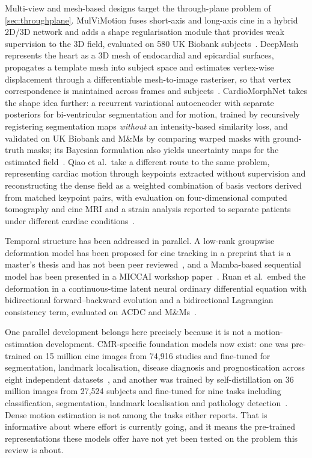 Multi-view and mesh-based designs target the through-plane problem of \cref{sec:throughplane}.
MulViMotion fuses short-axis and long-axis cine in a hybrid 2D/3D network and adds a shape
regularisation module that provides weak supervision to the 3D field, evaluated on 580 UK Biobank
subjects~\citep{meng2022mulvimotion}. DeepMesh represents the heart as a 3D mesh of endocardial and
epicardial surfaces, propagates a template mesh into subject space and estimates vertex-wise
displacement through a differentiable mesh-to-image rasteriser, so that vertex correspondence is
maintained across frames and subjects~\citep{meng2024deepmesh}. CardioMorphNet takes the shape idea
further: a recurrent variational autoencoder with separate posteriors for bi-ventricular
segmentation and for motion, trained by recursively registering segmentation maps \emph{without} an
intensity-based similarity loss, and validated on UK Biobank and M\&Ms by comparing warped masks
with ground-truth masks; its Bayesian formulation also yields uncertainty maps for the estimated
field~\citep{movahed2026cardiomorphnet}. Qiao et al.\ take a different route to the same problem,
representing cardiac motion through keypoints extracted without supervision and reconstructing the
dense field as a weighted combination of basis vectors derived from matched keypoint pairs, with
evaluation on four-dimensional computed tomography and cine MRI and a strain analysis reported to
separate patients under different cardiac conditions~\citep{qiao2026stcmt}.

Temporal structure has been addressed in parallel. A
low-rank groupwise deformation model has been proposed for cine tracking in a preprint that is a
master's thesis and has not been peer reviewed~\citep{rendell2024lowrank}, and a Mamba-based sequential
model has been presented in a MICCAI workshop paper~\citep{yin2025mcm}. Ruan et al.\ embed the
deformation in a continuous-time latent neural ordinary differential equation with bidirectional
forward--backward evolution and a bidirectional Lagrangian consistency term, evaluated on ACDC and
M\&Ms~\citep{ruan2026latentode}.

One parallel development belongs here precisely because it is not a motion-estimation development.
CMR-specific foundation models now exist: one was pre-trained on 15 million cine images from 74,916
studies and fine-tuned for segmentation, landmark localisation, disease diagnosis and
prognostication across eight independent datasets~\citep{fu2026cinema}, and another was trained by
self-distillation on 36 million images from 27,524 subjects and fine-tuned for nine tasks including
classification, segmentation, landmark localisation and pathology detection~\citep{jacob2025cmrfm}.
Dense motion estimation is not among the tasks either reports. That is informative about where
effort is currently going, and it means the pre-trained representations these models offer have not
yet been tested on the problem this review is about.

